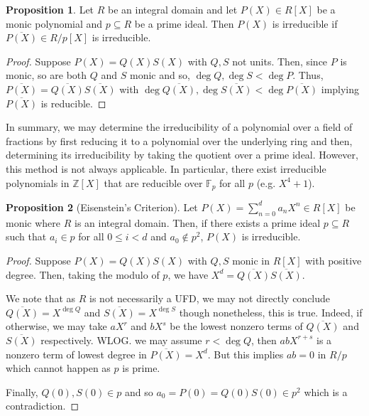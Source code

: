 \documentclass[]{article}
\theoremstyle{definition}
\theoremstyle{definition}
\newtheorem{proposition}{Proposition}[section]
\begin{document}
\begin{proposition}
  Let \(R\) be an integral domain and let \(P(X) \in R[X]\) be a monic polynomial 
  and \(p \subseteq R\) be a prime ideal. Then
  \(P(X)\) is irreducible if \(\overline{P(X)} \in R/p [X]\) is irreducible.
\end{proposition}
\begin{proof}
  Suppose \(P(X) = Q(X)S(X)\) with \(Q, S\) not units. Then, since \(P\) is monic,
  so are both \(Q\) and \(S\) monic and so, \(\deg Q, \deg S < \deg P\). Thus, 
  \(\overline{P(X)} = \overline{Q(X)} \overline{S(X)}\) with \(\deg \overline{Q(X)}, 
  \deg \overline{S(X)} < \deg \overline{P(X)}\) implying \(\overline{P(X)}\) is 
  reducible.
\end{proof}

In summary, we may determine the irreducibility of a polynomial over a field 
of fractions by first reducing it to a polynomial over the underlying ring and then, 
determining its irreducibility by taking the quotient over a prime ideal. 
However, this method is not always applicable. In particular, there exist 
irreducible polynomials in \(\mathbb{Z}[X]\) that are reducible over 
\(\mathbb{F}_p\) for all \(p\) (e.g. \(X^4 + 1\)).

\begin{proposition}[Eisenstein's Criterion]
  Let \(P(X) = \sum_{n = 0}^d a_n X^n \in R[X]\) be monic where \(R\) is an 
  integral domain. Then, if there exists a prime ideal \(p \subseteq R\) such that 
  \(a_i \in p\) for all \(0 \le i < d\) and \(a_0 \not\in p^2\), 
  \(P(X)\) is irreducible.
\end{proposition}
\begin{proof}
  Suppose \(P(X) = Q(X)S(X)\) with \(Q, S\) monic in \(R[X]\) with positive 
  degree. Then, taking the modulo of \(p\), we have 
  \(X^d = \overline{Q(X)} \overline{S(X)}\). 

  We note that as \(R\) is not necessarily a UFD, we may not directly conclude 
  \(\overline{Q(X)} = X^{\deg Q}\) and \(\overline{S(X)} = X^{\deg S}\) though 
  nonetheless, this is true. Indeed, if otherwise, we may take 
  \(aX^r\) and \(bX^s\) be the lowest nonzero terms of \(\overline{Q(X)}\) and 
  \(\overline{S(X)}\) respectively. WLOG. we may assume \(r < \deg Q\), then 
  \(abX^{r + s}\) is a nonzero term of lowest degree in \(\overline{P(X)} = X^d\). 
  But this implies \(ab = 0\) in \(R / p\) which cannot happen as \(p\) is prime. 

  Finally, \(Q(0), S(0) \in p\) and so \(a_0 = P(0) = Q(0) S(0) \in p^2\) which is a 
  contradiction.
\end{proof}
\end{document}
